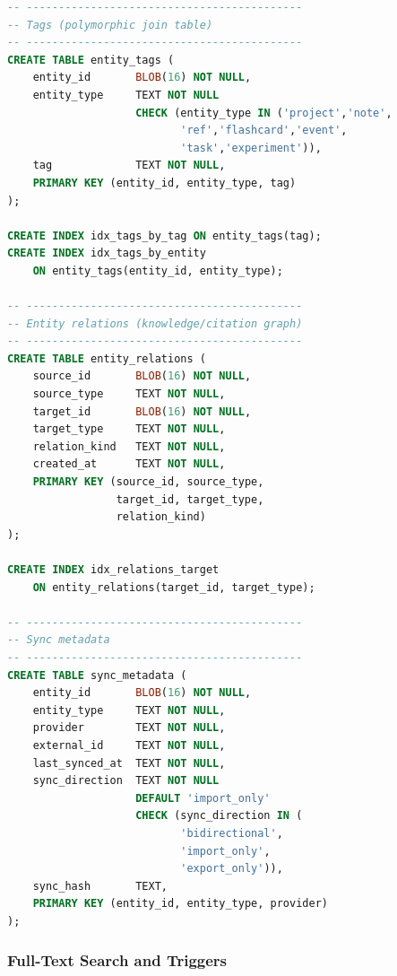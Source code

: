 \documentclass[11pt,a4paper]{article}
\begin{document}
\begin{lstlisting}[language=SQL, basicstyle=\ttfamily\footnotesize]
-- -------------------------------------------
-- Tags (polymorphic join table)
-- -------------------------------------------
CREATE TABLE entity_tags (
    entity_id       BLOB(16) NOT NULL,
    entity_type     TEXT NOT NULL
                    CHECK (entity_type IN ('project','note',
                           'ref','flashcard','event',
                           'task','experiment')),
    tag             TEXT NOT NULL,
    PRIMARY KEY (entity_id, entity_type, tag)
);

CREATE INDEX idx_tags_by_tag ON entity_tags(tag);
CREATE INDEX idx_tags_by_entity
    ON entity_tags(entity_id, entity_type);

-- -------------------------------------------
-- Entity relations (knowledge/citation graph)
-- -------------------------------------------
CREATE TABLE entity_relations (
    source_id       BLOB(16) NOT NULL,
    source_type     TEXT NOT NULL,
    target_id       BLOB(16) NOT NULL,
    target_type     TEXT NOT NULL,
    relation_kind   TEXT NOT NULL,
    created_at      TEXT NOT NULL,
    PRIMARY KEY (source_id, source_type,
                 target_id, target_type,
                 relation_kind)
);

CREATE INDEX idx_relations_target
    ON entity_relations(target_id, target_type);

-- -------------------------------------------
-- Sync metadata
-- -------------------------------------------
CREATE TABLE sync_metadata (
    entity_id       BLOB(16) NOT NULL,
    entity_type     TEXT NOT NULL,
    provider        TEXT NOT NULL,
    external_id     TEXT NOT NULL,
    last_synced_at  TEXT NOT NULL,
    sync_direction  TEXT NOT NULL
                    DEFAULT 'import_only'
                    CHECK (sync_direction IN (
                           'bidirectional',
                           'import_only',
                           'export_only')),
    sync_hash       TEXT,
    PRIMARY KEY (entity_id, entity_type, provider)
);
\end{lstlisting}

\subsubsection*{Full-Text Search and Triggers}
\end{document}
